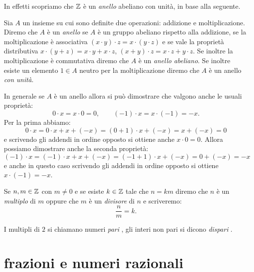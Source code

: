 In effetti scopriamo che ${\mathbb Z}$ è un \emph{anello}%
%
 abeliano con unità, in base alla seguente.
%
\begin{definition}[anello]
  \label{def:anello}%
  Sia $A$ un insieme su cui sono definite due operazioni: 
  addizione e moltiplicazione.  
  Diremo che $A$ è un \emph{anello} se $A$ è un gruppo abeliano rispetto alla 
  addizione, 
  se la moltiplicazione è associativa $(x\cdot y)\cdot z = x\cdot (y\cdot z)$ 
  e se vale la proprietà distributiva $x\cdot(y+z) = x\cdot y + x\cdot z$,
  $(x+y)\cdot z = x\cdot z + y\cdot z$.
  Se inoltre la moltiplicazione è commutativa diremo che $A$ è un \emph{anello abeliano}.
  Se inoltre esiste un elemento $1\in A$ neutro per la moltiplicazione 
  diremo che $A$ è un anello \emph{con unità}.
\end{definition}

In generale se $A$ è un anello allora si può dimostrare che valgono anche le usuali proprietà:
\[
  0\cdot x = x\cdot 0 = 0, \qquad
  (-1)\cdot x = x \cdot (-1) = -x.
\]
Per la prima abbiamo: 
\[
  0\cdot x = 0\cdot x + x + (-x) = (0+1)\cdot x + (-x) = x + (-x) = 0
\]
e scrivendo gli addendi in ordine opposto si ottiene anche $x\cdot 0 = 0$.
Allora possiamo dimostrare anche la seconda proprietà:
\[
   (-1)\cdot x = (-1)\cdot x + x + (-x) = (-1 + 1)\cdot x + (-x) = 0 + (-x) = -x
\]
e anche in questo caso scrivendo gli addendi in ordine opposto si ottiene $x\cdot(-1)=-x$.

Se $n,m\in{\mathbb Z}$ con $m\neq 0$ e 
%
se esiste $k\in{\mathbb Z}$ tale 
che $n=km$ diremo che $n$ è un \emph{multiplo}
di $m$ oppure che $m$ è un \emph{divisore}%
%
 di $n$
e scriveremo:
\[
  \frac{n}{m} = k.  
\]

I multipli di $2$ si chiamano numeri \emph{pari}%
%
,
gli interi non pari si dicono \emph{dispari}%
%
. 


\section{frazioni e numeri razionali}

